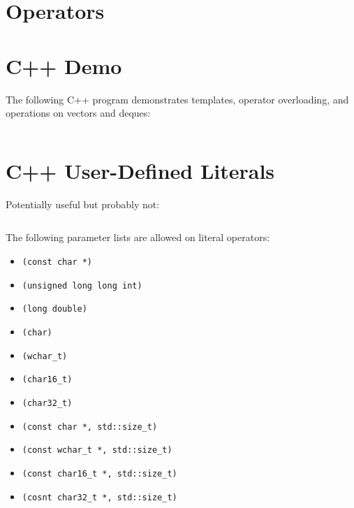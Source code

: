\documentclass[12pt,letterpaper,oneside]{article}
\begin{document}
\section*{Operators}


\newpage
\section*{C++ Demo}
The following C++ program demonstrates templates, operator overloading, and operations on vectors and deques:
\inputminted{cpp}{demos.cpp}

\newpage
\section*{C++ User-Defined Literals}
Potentially useful but probably not:
\inputminted{cpp}{literals.cpp}
The following parameter lists are allowed on literal operators:
\begin{itemize}[noitemsep]
	\item \texttt{(const char *)}
	\item \texttt{(unsigned long long int)}
	\item \texttt{(long double)}
	\item \texttt{(char)}
	\item \texttt{(wchar\_t)}
	\item \texttt{(char16\_t)}
	\item \texttt{(char32\_t)}
	\item \texttt{(const char *, std::size\_t)}
	\item \texttt{(const wchar\_t *, std::size\_t)}
	\item \texttt{(const char16\_t *, std::size\_t)}
	\item \texttt{(cosnt char32\_t *, std::size\_t)}
\end{itemize}
\end{document}
